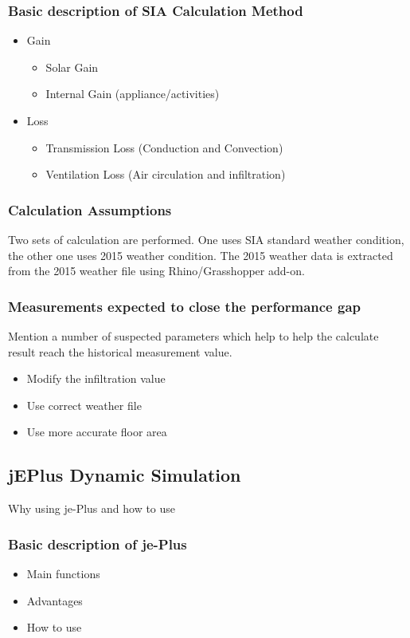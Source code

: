 \documentclass[11pt, a4paper]{article}
\theoremstyle{definition}
\begin{document}
		\subsubsection{Basic description of SIA Calculation Method}
			\begin{itemize}
				\item Gain
				\begin{itemize}
					\item Solar Gain
					\item Internal Gain (appliance/activities)
				\end{itemize}
				\item Loss
				\begin{itemize}
					\item Transmission Loss (Conduction and Convection)
					\item Ventilation Loss (Air circulation and infiltration)
				\end{itemize}
			\end{itemize}

		\subsubsection{Calculation Assumptions}	
			Two sets of calculation are performed. One uses SIA standard weather condition, the other one uses 2015 weather condition. The 2015 weather data is extracted from the 2015 weather file using Rhino/Grasshopper add-on.
		
		\subsubsection{Measurements expected to close the performance gap}
			Mention a number of suspected parameters which help to help the calculate result reach the historical measurement value.
			\begin{itemize}
				\item Modify the infiltration value
				\item Use correct weather file
				\item Use more accurate floor area
			\end{itemize}

	\subsection{jEPlus Dynamic Simulation}
		Why using je-Plus and how to use
		\subsubsection{Basic description of je-Plus}
		\begin{itemize}
			\item Main functions
			\item Advantages
			\item How to use
		\end{itemize}
	
\end{document}
